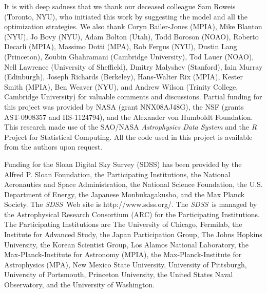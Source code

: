 \documentclass[12pt,preprint]{aastex}
\newcommand{\project}[1]{\textsl{#1}}
\newcommand{\sdss}{\project{SDSS}}
\newcommand{\SDSS}{\sdss}
\begin{document}
\acknowledgments It is with deep sadness that we thank our deceased
colleague Sam Roweis (Toronto, NYU), who initiated this work by
suggesting the model and all the optimization strategies.  We also
thank 
 Coryn Bailer-Jones (MPIA),
 Mike Blanton (NYU),
 Jo Bovy (NYU),
 Adam Bolton (Utah),
 Todd Boroson (NOAO),
 Roberto Decarli (MPIA),
 Massimo Dotti (MPA),
 Rob Fergus (NYU),
 Dustin Lang (Princeton),
 Zoubin Ghahramani (Cambridge University),
 Tod Lauer (NOAO),
 Nell Lawrence (University of Sheffield),
 Dmitry Malyshev (Stanford),
 Iain Murray (Edinburgh),
 Joseph Richards (Berkeley),
 Hans-Walter Rix (MPIA),
 Kester Smith (MPIA),
 Ben Weaver (NYU), and
 Andrew Wilson (Trinity College, Cambridge University) for valuable
comments and discussions. Partial funding for this project was
provided by NASA (grant NNX08AJ48G), the NSF (grants AST-0908357 and IIS-1124794), and
the Alexander von Humboldt Foundation.  This research made use of the
SAO/NASA \project{Astrophysics Data System} and the \project{R}
Project for Statistical Computing.  All the code used in this project
is available from the authors upon request.

Funding for the Sloan Digital Sky Survey (SDSS) has been provided by
the Alfred P. Sloan Foundation, the Participating Institutions, the
National Aeronautics and Space Administration, the National Science
Foundation, the U.S. Department of Energy, the Japanese
Monbukagakusho, and the Max Planck Society. The \SDSS\ Web site is
http://www.sdss.org/. The \SDSS\ is managed by the Astrophysical
Research Consortium (ARC) for the Participating Institutions. The
Participating Institutions are The University of Chicago, Fermilab,
the Institute for Advanced Study, the Japan Participation Group, The
Johns Hopkins University, the Korean Scientist Group, Los Alamos
National Laboratory, the Max-Planck-Institute for Astronomy (MPIA),
the Max-Planck-Institute for Astrophysics (MPA), New Mexico State
University, University of Pittsburgh, University of Portsmouth,
Princeton University, the United States Naval Observatory, and the
University of Washington.
\end{document}
